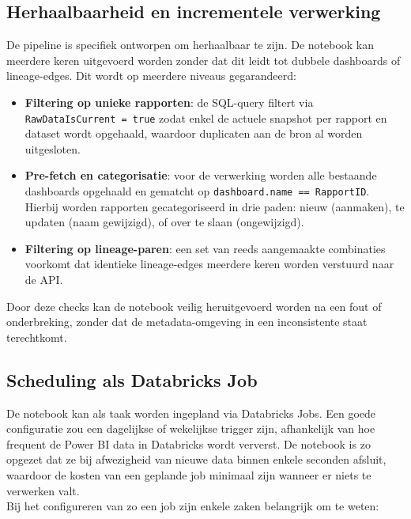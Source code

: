 \subsection{Herhaalbaarheid en incrementele verwerking}

De pipeline is specifiek ontworpen om herhaalbaar te zijn. De notebook kan meerdere keren uitgevoerd worden zonder dat dit leidt tot dubbele dashboards of lineage-edges. Dit wordt op meerdere niveaus gegarandeerd:

\begin{itemize}
	\item \textbf{Filtering op unieke rapporten}: de SQL-query filtert via \texttt{RawDataIsCurrent = true} zodat enkel de actuele snapshot per rapport en dataset wordt opgehaald, waardoor duplicaten aan de bron al worden uitgesloten.
	\item \textbf{Pre-fetch en categorisatie}: voor de verwerking worden alle bestaande dashboards opgehaald en gematcht op \texttt{dashboard.name == RapportID}. Hierbij worden rapporten gecategoriseerd in drie paden: nieuw (aanmaken), te updaten (naam gewijzigd), of over te slaan (ongewijzigd).
	\item \textbf{Filtering op lineage-paren}: een set van reeds aangemaakte combinaties voorkomt dat identieke lineage-edges meerdere keren worden verstuurd naar de API.
\end{itemize}

Door deze checks kan de notebook veilig heruitgevoerd worden na een fout of onderbreking, zonder dat de metadata-omgeving in een inconsistente staat terechtkomt.\\

\subsection{Scheduling als Databricks Job}

De notebook kan als taak worden ingepland via Databricks Jobs. Een goede configuratie zou een dagelijkse of wekelijkse trigger zijn, afhankelijk van hoe frequent de Power BI data in Databricks wordt ververst. De notebook is zo opgezet dat ze bij afwezigheid van nieuwe data binnen enkele seconden afsluit, waardoor de kosten van een geplande job minimaal zijn wanneer er niets te verwerken valt.\\

Bij het configureren van zo een job zijn enkele zaken belangrijk om te weten:

